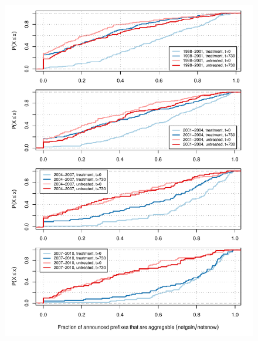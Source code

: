 \begin{figure}[H]
\begin{centering}
\begin{singlespace}
    \includegraphics[width=6in]
        {figures/behavior-frac_deagg-vseries-special_tc.pdf}
    \vspace{-2em}\\
    \caption{}
\end{singlespace}
\end{centering}
\end{figure}





